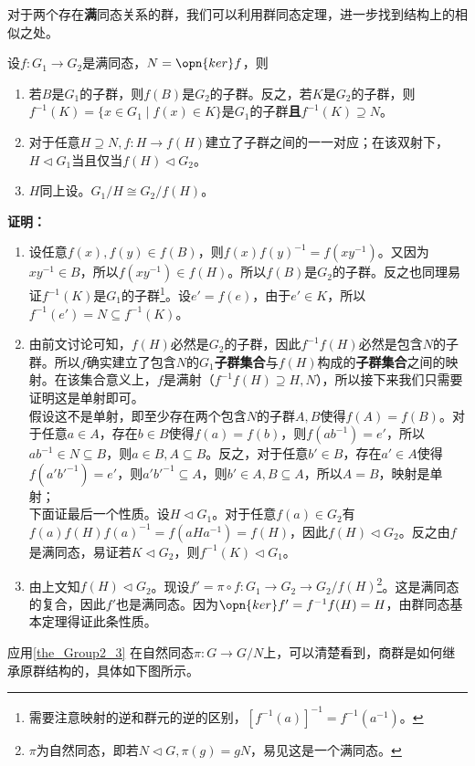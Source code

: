对于两个存在\textbf{满}同态关系的群，我们可以利用群同态定理，进一步找到结构上的相似之处。
\begin{theorem}{}\label{the_Group2_3}
设$f:G_1\to G_2$是满同态，$N=\opn{ker}f$，则
\begin{enumerate}
\item 若$B$是$G_1$的子群，则$f(B)$是$G_2$的子群。反之，若$K$是$G_2$的子群，则$f^{-1}(K)=\{x\in G_1\mid f(x)\in K\}$是$G_1$的子群\textbf{且$f^{-1}(K)\supseteq N$}。
\item 对于任意$H\supseteq N,f:H\to f(H)$建立了子群之间的一一对应；在该双射下，$H\lhd G_1$当且仅当$f(H)\lhd G_2$。
\item $H$同上设。$G_1/H\cong G_2/f(H)$。
\end{enumerate}
\end{theorem}
\textbf{证明：}
\begin{enumerate}
\item 设任意$f(x),f(y)\in f(B)$，则$f(x)f(y)^{-1}=f(xy^{-1})$。又因为$xy^{-1}\in B$，所以$f(xy^{-1})\in f(H)$。所以$f(B)$是$G_2$的子群。反之也同理易证$f^{-1}(K)$是$G_1$的子群\footnote{需要注意映射的逆和群元的逆的区别，$[f^{-1}(a)]^{-1}=f^{-1}(a^{-1})$。}。设$e'=f(e)$，由于$e'\in K$，所以$f^{-1}(e')=N\subseteq f^{-1}(K) $。
\item 
由前文讨论可知，$f(H)$必然是$G_2$的子群，因此$f^{-1}f(H)$必然是包含$N$的子群。所以$f$确实建立了包含$N$的$G_1$\textbf{子群集合}与$f(H)$构成的\textbf{子群集合}之间的映射。在该集合意义上，$f$是满射（$f^{-1}f(H)\supseteq H,N$），所以接下来我们只需要证明这是单射即可。\\


假设这不是单射，即至少存在两个包含$N$的子群$A,B$使得$f(A)=f(B)$。对于任意$a\in A$，存在$b\in B$使得$f(a)=f(b)$，则$f(ab^{-1})=e'$，所以$ab^{-1}\in N\subseteq B$，则$a\in B, A\subseteq B$。反之，对于任意$b'\in B$，存在$a'\in A$使得$f(a'b'^{-1})=e'$，则$a'b'^{-1}\subseteq A$，则$b'\in A,B\subseteq A$，所以$A=B$，映射是单射；\\
下面证最后一个性质。设$H\lhd G_1$。对于任意$f(a)\in G_2$有$f(a)f(H)f(a)^{-1}=f(aHa^{-1})=f(H)$，因此$f(H)\lhd G_2$。反之由$f$是满同态，易证若$K\lhd G_2$，则$f^{-1}(K)\lhd G_1$。\\


\item 由上文知$f(H)\lhd G_2$。现设$f'=\pi \circ f:G_1\to G_2\to G_2/f(H)$\footnote{$\pi$为自然同态，即若$N\lhd G,\pi(g)=gN$，易见这是一个满同态。}。这是满同态的复合，因此$f'$也是满同态。因为$\opn{ker}f'=f^{-1}f(H)=H$，由群同态基本定理得证此条性质。
\end{enumerate}
应用\autoref{the_Group2_3} 在自然同态$\pi:G\to G/N$上，可以清楚看到，商群是如何继承原群结构的，具体如下图所示。

